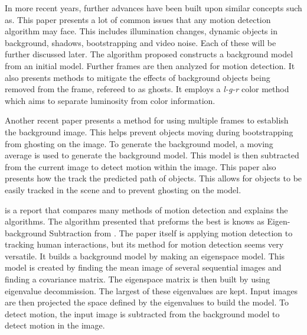 \documentclass[journal]{IEEEtran}
\begin{document}
    In more recent years, further advances have been built upon similar concepts such as\cite{Sing}.
    This paper presents a lot of common issues that any motion detection algorithm may face. This includes illumination changes,
    dynamic objects in background, shadows, bootstrapping and video noise. Each of these will be further discussed later. The
    algorithm proposed constructs a background model from an initial model. Further frames are then analyzed for motion detection.
    It also presents methods to mitigate the effects of background objects being removed from the frame, refereed to as ghosts. It
    employs a \emph{l-g-r} color method which aims to separate luminosity from color information.

    Another recent paper \cite{Gaba} presents a method for using multiple frames to establish the background image. This helps
    prevent objects moving during bootstrapping from ghosting on the image. To generate the background model, a moving average is
    used to generate the background model. This model is then  subtracted from the current image to detect motion within the image.
    This paper also presents how the track the predicted path of objects. This allows for objects to be easily tracked in the scene
    and to prevent ghosting on the model.

    \cite{Sehairi_2017} is a report that compares many methods of motion detection and explains the algorithms. The algorithm presented that
    preforms the best is knows as Eigen-background Subtraction from \cite{Oliver}. The paper itself is applying motion detection to tracking
    human interactions, but its method for motion  detection seems very versatile. It builds a background model by making an eigenspace model.
    This model is created by finding the mean image of several sequential images and finding a covariance matrix. The eigenspace matrix is then
    built by using eigenvalue decommission. The largest of these eigenvalues are kept. Input images are then projected the space defined by
    the eigenvalues to build the model. To detect motion, the input image is subtracted from the background model to detect motion in the
    image.
\end{document}
